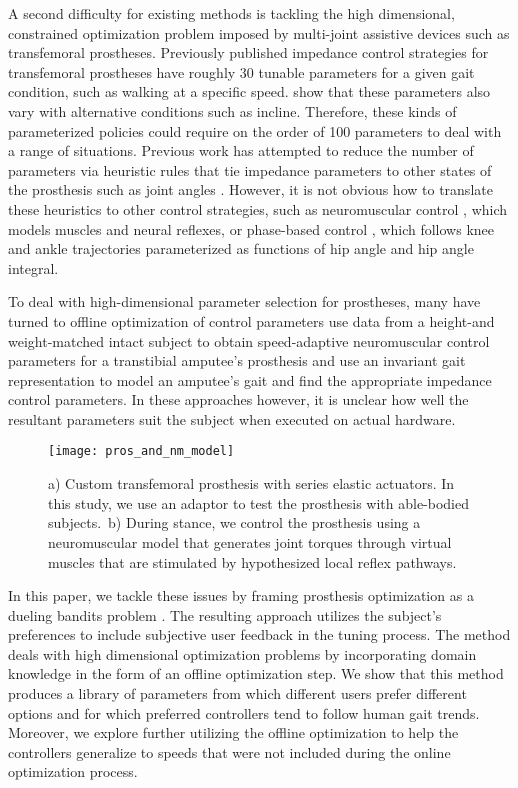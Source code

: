 A second difficulty for existing methods is tackling the high dimensional,
constrained optimization problem imposed by multi-joint assistive devices such
as transfemoral prostheses. Previously published impedance control strategies
for transfemoral prostheses have roughly 30 tunable parameters for a given gait
condition, such as walking at a specific speed. \citet{sup2011upslope} show that
these parameters also vary with alternative conditions such as incline.
Therefore, these kinds of parameterized policies could require on the order of
100 parameters to deal with a range of situations. Previous work has attempted
to reduce the number of parameters via heuristic rules that tie impedance
parameters to other states of the prosthesis such as joint angles
\citep{simon2014configuring}.  However, it is not obvious how to translate these
heuristics to other control strategies, such as neuromuscular control
\citep{thatte2016toward}, which models muscles and neural reflexes, or
phase-based control \citep{quintero2016preliminary}, which follows knee and
ankle trajectories parameterized as functions of hip angle and hip angle
integral.

To deal with high-dimensional parameter selection for prostheses, many have
turned to offline optimization of control parameters \citet{markowitz2011speed}
use data from a height-and weight-matched intact subject to obtain
speed-adaptive neuromuscular control parameters for a transtibial amputee's
prosthesis and \citet{aghasadeghi2013learning} use an invariant gait
representation to model an amputee's gait and find the appropriate impedance
control parameters. In these approaches however, it is unclear how well the
resultant parameters suit the subject when executed on actual hardware.

\begin{figure*}[t]
    \centering
    \texttt{[image: pros\_and\_nm\_model]}
    \caption{a) Custom transfemoral prosthesis with series elastic actuators. In
    this study, we use an adaptor to test the prosthesis with able-bodied
    subjects.\ b) During stance, we control the prosthesis using a neuromuscular
    model that generates joint torques through virtual muscles that are
    stimulated by hypothesized local reflex
    pathways.}\label{fig:prosthesis_bandit_opt}
\end{figure*}

In this paper, we tackle these issues by framing prosthesis optimization as a
dueling bandits problem \citep{yue2012k}. The resulting approach utilizes the
subject's preferences to include subjective user feedback in the tuning process.
The method deals with high dimensional optimization problems by incorporating
domain knowledge in the form of an offline optimization step. We show that this
method produces a library of parameters from which different users prefer
different options and for which preferred controllers tend to follow human gait
trends. Moreover, we explore further utilizing the offline optimization to help
the controllers generalize to speeds that were not included during the online
optimization process.
